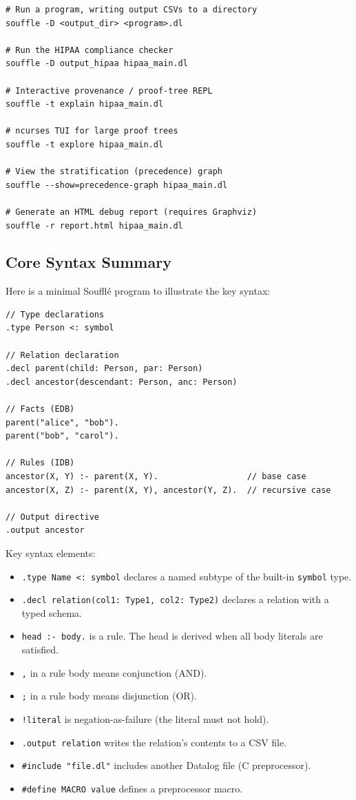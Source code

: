 \documentclass[11pt,letterpaper]{article}
\begin{document}
\begin{lstlisting}[style=bashstyle]
# Run a program, writing output CSVs to a directory
souffle -D <output_dir> <program>.dl

# Run the HIPAA compliance checker
souffle -D output_hipaa hipaa_main.dl

# Interactive provenance / proof-tree REPL
souffle -t explain hipaa_main.dl

# ncurses TUI for large proof trees
souffle -t explore hipaa_main.dl

# View the stratification (precedence) graph
souffle --show=precedence-graph hipaa_main.dl

# Generate an HTML debug report (requires Graphviz)
souffle -r report.html hipaa_main.dl
\end{lstlisting}

\subsection{Core Syntax Summary}

Here is a minimal Souffl\'{e} program to illustrate the key syntax:

\begin{lstlisting}[style=soufflestyle,caption={Minimal Souffl\'{e} example}]
// Type declarations
.type Person <: symbol

// Relation declaration
.decl parent(child: Person, par: Person)
.decl ancestor(descendant: Person, anc: Person)

// Facts (EDB)
parent("alice", "bob").
parent("bob", "carol").

// Rules (IDB)
ancestor(X, Y) :- parent(X, Y).                  // base case
ancestor(X, Z) :- parent(X, Y), ancestor(Y, Z).  // recursive case

// Output directive
.output ancestor
\end{lstlisting}

Key syntax elements:
\begin{itemize}
  \item \texttt{.type Name <: symbol} declares a named subtype of the built-in \texttt{symbol} type.
  \item \texttt{.decl relation(col1: Type1, col2: Type2)} declares a relation with a typed schema.
  \item \texttt{head :- body.} is a rule. The head is derived when all body literals are satisfied.
  \item \texttt{,} in a rule body means conjunction (AND).
  \item \texttt{;} in a rule body means disjunction (OR).
  \item \texttt{!literal} is negation-as-failure (the literal must not hold).
  \item \texttt{.output relation} writes the relation's contents to a CSV file.
  \item \texttt{\#include "file.dl"} includes another Datalog file (C preprocessor).
  \item \texttt{\#define MACRO value} defines a preprocessor macro.
\end{itemize}
\end{document}
